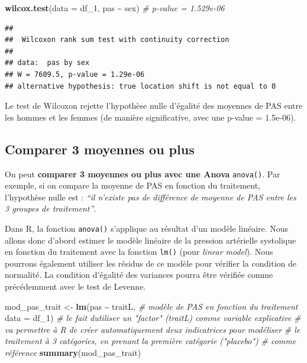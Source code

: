 \documentclass[
]{book}
\newenvironment{Shaded}{\begin{snugshade}}{\end{snugshade}}
\newcommand{\AttributeTok}[1]{\textcolor[rgb]{0.13,0.29,0.53}{#1}}
\newcommand{\CommentTok}[1]{\textcolor[rgb]{0.56,0.35,0.01}{\textit{#1}}}
\newcommand{\FunctionTok}[1]{\textcolor[rgb]{0.13,0.29,0.53}{\textbf{#1}}}
\newcommand{\NormalTok}[1]{#1}
\newcommand{\OtherTok}[1]{\textcolor[rgb]{0.56,0.35,0.01}{#1}}
\newcommand{\SpecialCharTok}[1]{\textcolor[rgb]{0.81,0.36,0.00}{\textbf{#1}}}
\begin{document}
\begin{Shaded}
\begin{Highlighting}[]
\FunctionTok{wilcox.test}\NormalTok{(}\AttributeTok{data =}\NormalTok{ df\_1, pas }\SpecialCharTok{\textasciitilde{}}\NormalTok{ sex) }\CommentTok{\# p{-}value = 1.529e{-}06}
\end{Highlighting}
\end{Shaded}

\begin{verbatim}
## 
##  Wilcoxon rank sum test with continuity correction
## 
## data:  pas by sex
## W = 7609.5, p-value = 1.29e-06
## alternative hypothesis: true location shift is not equal to 0
\end{verbatim}

Le test de Wilcoxon rejette l'hypothèse nulle d'égalité des moyennes de PAS entre les hommes et les femmes (de manière significative, avec une p-value = 1.5e-06).

\subsection{Comparer 3 moyennes ou plus}\label{comparer-3-moyennes-ou-plus}

On peut \textbf{comparer 3 moyennes ou plus avec une Anova} \texttt{anova()}. Par exemple, si on compare la moyenne de PAS en fonction du traitement, l'hypothèse nulle est : \emph{``il n'existe pas de différence de moyenne de PAS entre les 3 groupes de traitement''}.

Dans R, la fonction \texttt{anova()} s'applique au résultat d'un modèle linéaire. Nous allons donc d'abord estimer le modèle linéaire de la pression artérielle systolique en fonction du traitement avec la fonction \texttt{lm()} (pour \emph{linear model}). Nous pourrons également utiliser les résidus de ce modèle pour vérifier la condition de normalité. La condition d'égalité des variances pourra être vérifiée comme précédemment avec le test de Levenne.

\begin{Shaded}
\begin{Highlighting}[]
\NormalTok{mod\_pas\_trait }\OtherTok{\textless{}{-}} \FunctionTok{lm}\NormalTok{(pas }\SpecialCharTok{\textasciitilde{}}\NormalTok{ traitL, }\CommentTok{\# modèle de PAS en fonction du traitement}
                    \AttributeTok{data =}\NormalTok{ df\_1)}
\CommentTok{\# le fait d\textquotesingle{}utiliser un "factor" (traitL) comme variable explicative}
\CommentTok{\# va permettre à R de créer automatiquement deux indicatrices pour modéliser}
\CommentTok{\# le traitement à 3 catégories, en prenant la première catégorie ("placebo")}
\CommentTok{\# comme référence}
\FunctionTok{summary}\NormalTok{(mod\_pas\_trait)}
\end{Highlighting}
\end{Shaded}
\end{document}
